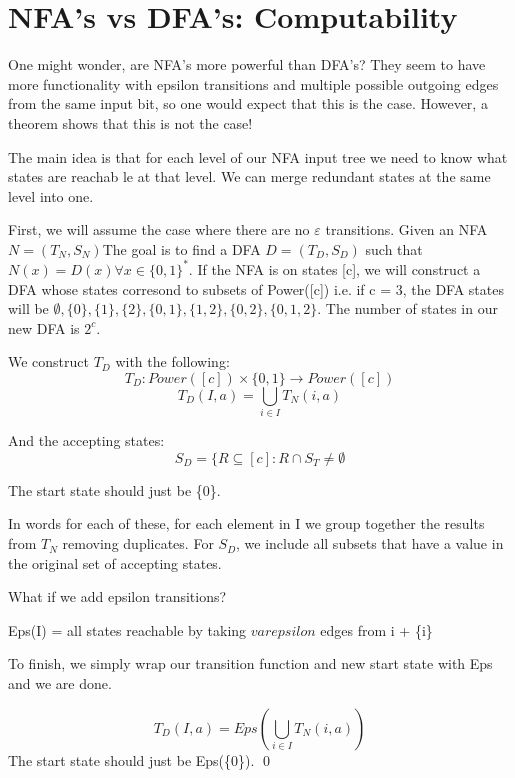 \section{NFA's vs DFA's: Computability}
One might wonder, are NFA's more powerful than DFA's? They seem to have more functionality with epsilon transitions and multiple possible outgoing edges from the same input bit, so one would expect that this is the case. However, a  theorem shows that this is not the case! 

{
    The main idea is that for each level of our NFA input tree we need to know what states are reachab le at that level. We can merge redundant states at the same level into one. 

    First, we will assume the case where there are no $\varepsilon$ transitions. Given an NFA $N = (T_N, S_N)$The goal is to find a DFA $D = (T_D, S_D)$ such that $N(x) = D(x) \forall x \in \{0,1\}^*$. If the NFA is on states [c], we will construct a DFA whose states corresond to subsets of Power([c]) i.e. if c = 3, the DFA states will be $\emptyset, \{0\}, \{1\}, \{2\}, \{0, 1\}, \{1, 2\}, \{0, 2\}, \{0, 1, 2\}$. The number of states in our new DFA is $2^c$.

    We construct $T_D$ with the following: 
    $$ T_D: Power([c]) \times \{0,1\} \rightarrow Power([c])$$
    $$ T_D(I, a) = \bigcup_{i \in I}T_N(i, a) $$

    And the accepting states:
    $$ S_D = \{ R \subseteq [c]: R \cap S_T \neq \emptyset $$

    The start state should just be \{0\}.

    In words for each of these, for each element in I we group together the results from $T_N$ removing duplicates. For $S_D$, we include all subsets that have a value in the original set of accepting states.

    \hr 

    What if we add epsilon transitions?

    \begin{definition}
        Eps(I) = all states reachable by taking $varepsilon$ edges from i + \{i\}
    \end{definition}

    To finish, we simply wrap our transition function and new start state with Eps and we are done.

    $$ T_D(I, a) = Eps(\bigcup_{i \in I}T_N(i, a)) $$
    The start state should just be Eps(\{0\}).
    \qed
}